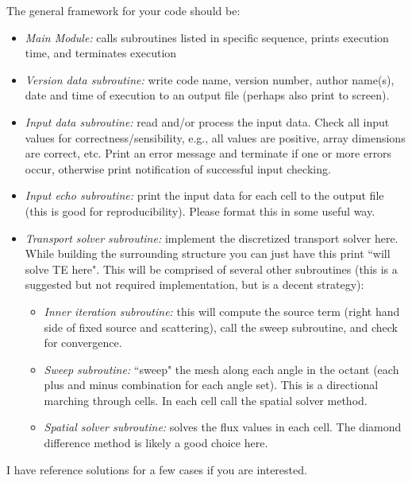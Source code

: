 \documentclass[12pt]{article}
\begin{document}
The general framework for your code should be:
\begin{itemize}
\item \textit{Main Module:} calls subroutines listed in specific sequence, prints execution time, and terminates execution

\item \textit{Version data subroutine:} write code name, version number, author name(s), date and time of execution to an output file (perhaps also print to screen).

\item \textit{Input data subroutine:} read and/or process the input data. Check all input values for correctness/sensibility, e.g., all values are positive, array dimensions are correct, etc. Print an error message and terminate if one or more errors occur, otherwise print notification of successful input checking. 

\item \textit{Input echo subroutine:} print the input data for each cell to the output file (this is good for reproducibility). Please format this in some useful way.

\item \textit{Transport solver subroutine:} implement the discretized transport solver here. While building the surrounding structure you can just have this print ``will solve TE here". This will be comprised of several other subroutines (this is a suggested but not required implementation, but is a decent strategy):

\begin{itemize}
\item \textit{Inner iteration subroutine:} this will compute the source term (right hand side of fixed source and scattering), call the sweep subroutine, and check for convergence.

\item \textit{Sweep subroutine:} ``sweep" the mesh along each angle in the octant (each plus and minus combination for each angle set). This is a directional marching through cells. In each cell call the spatial solver method.

\item \textit{Spatial solver subroutine:} solves the flux values in each cell. The diamond difference method is likely a good choice here.
\end{itemize}

\end{itemize}

I have reference solutions for a few cases if you are interested.
\end{document}
